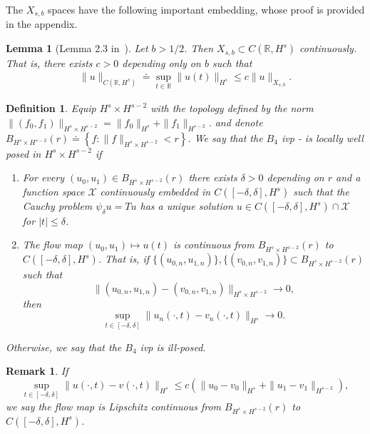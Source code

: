\documentclass[12pt,reqno]{amsart}
\numberwithin{equation}{section}  %
\renewcommand{\cref}{\Cref}
\newcommand{\rr}{\mathbb{R}}
\newtheorem{lemma}[theorem]{Lemma}
\newtheorem{definition}[theorem]{Definition}
\newtheorem{remark}[theorem]{Remark}
\begin{document}
%
The $X_{s,b}$ spaces have the following important embedding, whose proof is
provided in the appendix.
%
%
%
%
%
%
%
%
\begin{lemma}[Lemma 2.3 in~\cite{Farah:2009uq}]
  Let $b > 1/2$. Then $X_{s, b} \subset C(\rr, H^s)$ continuously. That is,
  there exists $c>0$ depending only on $b$ such that
%
%
\begin{equation*}
\begin{split}
  \| u \|_{C(\rr, H^s)} \doteq \sup_{t \in \rr} \| u(t) \|_{H^s} 
  \le c \| u \|_{X_{s,b}}.
\end{split}
\end{equation*}
%
\label{lem:embedding}
\end{lemma}
%
\begin{definition}
  Equip $H^{s} \times H^{s-2}$ with the 
  topology defined by the norm $\|(f_0, f_1)\|_{H^{s} \times H^{s-2}}
  = \|f_0\|_{H^{s}} + \|f_1\|_{H^{s-2}}$.
  and denote $B_{H^{s} \times H^{s-2}}(r) \doteq \left\{f: \| f \|_{H^{s} \times
  H^{s-2}} < r
  \right\}$. We say that the $B_{4}$ ivp
  \cref{eqn:mb-2}-\cref{eqn:mb-init-data-2} is
	\emph{locally well posed} in
  $H^s \times H^{s-2}$ if 
	\begin{enumerate}
    \item For every $(u_{0}, u_{1}) \in B_{H^{s} \times H^{s-2}}(r)$
      there exists $\delta>0$ depending on $r$ and a function space
      $\mathcal{X}$ continuously embedded in $C([-\delta,
      \delta], H^s)$ such that the Cauchy problem
      $\psi_{\delta} u = Tu$ has a unique solution $u \in C([-\delta,
      \delta], H^s) \cap \mathcal{X}$ for $ |t| \le \delta$.
    \item
      The flow map $(u_0, u_{1}) \mapsto u(t)$ is continuous from
      $B_{H^{s} \times H^{s-2}}(r)$ to \\ $C(\left[ -\delta, \delta \right], H^s)$. That is, if
      $\{(u_{0,n}, u_{1,n} ) \}, \{(v_{0,n}, v_{1,n} )\}
      \subset B_{H^{s} \times H^{s-2}}(r)$ such that $$\|(u_{0,n}, u_{1,n}) -
      (v_{0,n}, v_{1,n}) \|_{H^{s} \times H^{s-2}} \to 0,$$ then 
      $$\sup_{t \in [-\delta, \delta]}
      \|u_{n}(\cdot, t) - v_{n}(\cdot, t) \|_{H^s} \to 0.$$
  \end{enumerate}
	Otherwise, we say that the $B_{4}$ ivp is \emph{ill-posed}.
\end{definition}
%
\begin{framed}
\begin{remark}
  If $$\sup_{t \in [-\delta, \delta]}\|u(\cdot, t) - v(\cdot, t)
  \|_{H^{s}} \le c \left( \|u_{0} - v_0 \|_{H^{s}} + \|u_{1} - v_1 \|_{H^{s-2}}
  \right),$$ we
  say the flow map is \emph{Lipschitz continuous} from $B_{H^{s} \times H^{s-2}}(r)$ 
  to $C(\left[ -\delta, \delta \right], H^s)$. 
%
%
\label{rem:lipschitz-cont}
\end{remark}
\end{framed}
\end{document}

